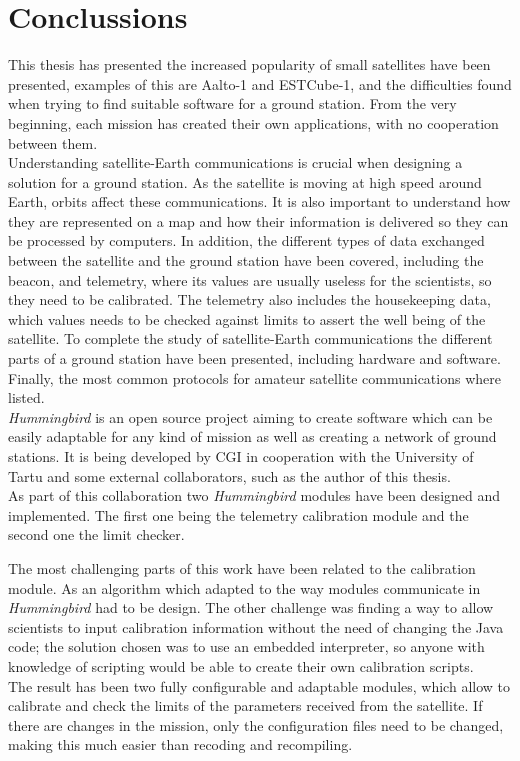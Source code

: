 \chapter{Conclussions}

This thesis has presented the increased popularity of small satellites have been presented, examples of this are Aalto-1 and ESTCube-1, and the difficulties found when trying to find suitable software for a ground station. From the very beginning, each mission has created their own applications, with no cooperation between them.\\

Understanding satellite-Earth communications is crucial when designing a solution for a ground station. As the satellite is moving at high speed around Earth, orbits affect these communications. It is also important to understand how they are represented on a map and how their information is delivered so they can be processed by computers. In addition, the different types of data exchanged between the satellite and the ground station have been covered, including the beacon, and telemetry, where its values are usually useless for the scientists, so they need to be calibrated. The telemetry also includes the housekeeping data, which values needs to be checked against limits to assert the well being of the satellite. To complete the study of satellite-Earth communications the different parts of a ground station have been presented, including hardware and software. Finally, the most common protocols for amateur satellite communications where listed.\\

\emph{Hummingbird} is an open source project aiming to create software which can be easily adaptable for any kind of mission as well as creating a network of ground stations. It is being developed by CGI in cooperation with the University of Tartu and some external collaborators, such as the author of this thesis.\\ 

As part of this collaboration two \emph{Hummingbird} modules have been designed and implemented. The first one being the telemetry calibration module and the second one the limit checker. 

The most challenging parts of this work have been related to the calibration module. As an algorithm which adapted to the way modules communicate in \emph{Hummingbird} had to be design. The other challenge was finding a way to allow scientists to input calibration information without the need of changing the Java code; the solution chosen was to use an embedded  interpreter, so anyone with knowledge of scripting would be able to create their own calibration scripts.\\

The result has been two fully configurable and adaptable modules, which allow to calibrate and check the limits of the parameters received from the satellite. If there are changes in the mission, only the configuration files need to be changed, making this much easier than recoding and recompiling.\\